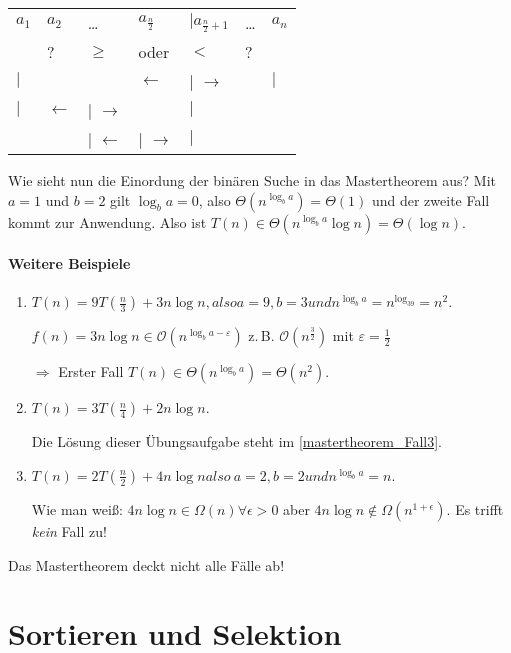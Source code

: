 \documentclass[ngerman,draft,parskip=half*,twoside]{scrreprt}
\theoremstyle{break}
\theoremstyle{nonumberbreak}
\newcommand*{\OO}{\mathcal{O}}      %
\begin{document}
\begin{tabular}{lllllll}
$a_1$     & $a_2$           & \dots   &  $ a_{\frac{n}{2}}$ & $ \vert a_{\frac{n}{2}+1}$ & \dots  & $a_n$ \\
          &       ?         & $\geq$  & oder                  & $<$                          &  ?     &\\
$\vert$   &                 &         & $\gets$               & $\vert$ $\to$                &        & $\vert$\\
$\vert$   & $\gets$ & $\vert$ $\to$ & & $\vert$\\
&         & $\vert$ $\gets$ & $\vert$ $\to$ & $\vert$
\end{tabular}


Wie sieht nun die Einordung der binären Suche in das Mastertheorem aus?
Mit $a = 1$ und $b = 2$ gilt $\log_ba = 0$, also $\Theta(n^{\log_ba})=\Theta(1)$ und der zweite Fall kommt zur Anwendung.
Also ist $T(n) \in \Theta(n^{\log_ba}\log n)=\Theta(\log n)$.

\subsubsection{Weitere Beispiele}
\begin{enumerate}
\item $ T(n) = 9 T(\frac{n}{3}) + 3 n\log n, alsoa = 9,b = 3
undn^{\log_ba} = n^{\log_39} = n^2.$

$f(n) = 3n\log n \in \OO(n^{\log_ba-\varepsilon}) $
z.\,B. $\OO(n^{\frac{3}{2}})$ mit $ \varepsilon = \frac{1}{2} $

$ \Rightarrow $ Erster Fall $ T(n) \in \Theta(n^{\log_ba}) = \Theta (n^2) $.

\item $ T(n) = 3 T(\frac{n}{4}) + 2n\log n$.

Die Lösung dieser Übungsaufgabe steht im \autoref{mastertheorem_Fall3}.

\item $ T(n) = 2 T(\frac{n}{2}) + 4n\log nalso\
a = 2,b = 2undn^{\log_ba} = n $.

Wie man weiß: $4n\log n \in \Omega(n)\forall \epsilon >0$ aber $4n\log
n \notin \Omega(n^{1+\epsilon})$. Es trifft \emph{kein} Fall zu!
\end{enumerate}
Das Mastertheorem deckt nicht alle Fälle ab!
	
%
\chapter{Sortieren und Selektion}
\end{document}
